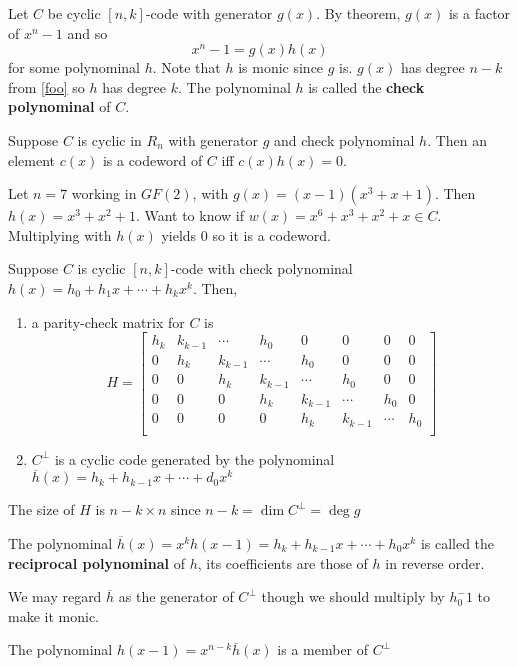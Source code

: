 \documentclass{article}
\begin{document}
\begin{definition}
  Let \( C \) be cyclic \( [n, k] \)-code with generator \( g(x) \).
  By theorem, \( g(x) \) is a factor of \( x^n-1 \) and so \[
    x^n-1= g(x)h(x)
  \] for some polynominal \( h \). Note that \( h  \) is monic since
  \( g  \) is. \( g(x) \) has degree \( n-k  \) from \autoref{foo} so
  \( h  \) has degree \( k \). The polynominal \( h  \) is called the
  \textbf{check polynominal} of \( C \).
\end{definition}
\begin{theorem}
  Suppose \( C \) is cyclic in \( R_n  \) with generator \( g  \) and
  check polynominal \( h \). Then an element \( c(x)  \) is a
  codeword of \( C \) iff \( c(x)h(x) = 0 \).
\end{theorem}
\begin{example}
  Let \( n = 7 \) working in \( GF(2) \), with \( g(x) =  (x-1)(x^3+x+1)\). Then \( h(x) = x^3+x^2+1 \). Want to know if \( w(x) = x^6+x^3+x^2+x \in C \). Multiplying with \( h(x) \) yields \( 0 \) so it is a codeword.
\end{example}
\begin{theorem}
  Suppose \( C  \) is cyclic \( [n, k] \)-code with check polynominal
  \( h(x) = h_0 + h_1x + \cdots + h_kx^k \). Then,
  \begin{enumerate}
    \item a parity-check matrix for \( C  \) is \[
        H =
        \begin{bmatrix}
          h_k & k_{k-1} & \cdots  & h_0 & 0 & 0 & 0 & 0\\
          0 & h_k  & k_{k-1} & \cdots  & h_0 & 0 & 0 & 0\\
          0 & 0 & h_k  & k_{k-1} & \cdots  & h_0 & 0 & 0\\
          0 & 0 & 0 & h_k  & k_{k-1} & \cdots  & h_0 & 0\\
          0 & 0 & 0 & 0 & h_k  & k_{k-1} & \cdots  & h_0\\
        \end{bmatrix}
      \]
    \item \( C^\perp \) is a cyclic code generated by the polynominal \(
      \overline{h}(x) = h_k + h_{k-1}x + \cdots + d_0x^k   \)
  \end{enumerate}

  The size of \( H \) is \( n - k \times n\) since \( n-k = \dim C^\perp = \deg g  \) 
\end{theorem}
\begin{definition}
  The polynominal \( \overline{h}(x) = x^kh(x-1) = h_k + h_{k-1}x + \cdots + h_0x^k    \) is called the \textbf{reciprocal polynominal} of \( h \), its coefficients are those of \( h   \) in reverse order.

  We may regard \( \overline{h}  \) as the generator of \( C^\perp  \) though we should multiply by \( h_0^-1 \) to make it monic.
\end{definition}
\begin{remark}
  The polynominal \( h(x-1) =x^{n-k}\overline{h}(x) \) is a member of \( C^\perp  \)
\end{remark}
\end{document}
